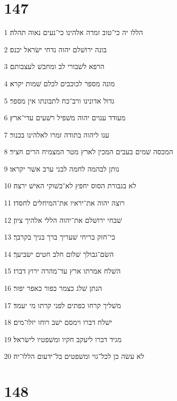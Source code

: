 \chapter{147}

\par 1 הללו יה כי־טוב זמרה אלהינו כי־נעים נאוה תהלה׃
\par 2 בונה ירושׁלם יהוה נדחי ישׂראל יכנס׃
\par 3 הרפא לשׁבורי לב ומחבשׁ לעצבותם׃
\par 4 מונה מספר לכוכבים לכלם שׁמות יקרא׃
\par 5 גדול אדונינו ורב־כח לתבונתו אין מספר׃
\par 6 מעודד ענוים יהוה משׁפיל רשׁעים עדי־ארץ׃
\par 7 ענו ליהוה בתודה זמרו לאלהינו בכנור׃
\par 8 המכסה שׁמים בעבים המכין לארץ מטר המצמיח הרים חציר׃
\par 9 נותן לבהמה לחמה לבני ערב אשׁר יקראו׃
\par 10 לא בגבורת הסוס יחפץ לא־בשׁוקי האישׁ ירצה׃
\par 11 רוצה יהוה את־יראיו את־המיחלים לחסדו׃
\par 12 שׁבחי ירושׁלם את־יהוה הללי אלהיך ציון׃
\par 13 כי־חזק בריחי שׁעריך ברך בניך בקרבך׃
\par 14 השׂם־גבולך שׁלום חלב חטים ישׂביעך׃
\par 15 השׁלח אמרתו ארץ עד־מהרה ירוץ דברו׃
\par 16 הנתן שׁלג כצמר כפור כאפר יפזר׃
\par 17 משׁליך קרחו כפתים לפני קרתו מי יעמד׃
\par 18 ישׁלח דברו וימסם ישׁב רוחו יזלו־מים׃
\par 19 מגיד דברו ליעקב חקיו ומשׁפטיו לישׂראל׃
\par 20 לא עשׂה כן לכל־גוי ומשׁפטים בל־ידעום הללו־יה׃

\chapter{148}

